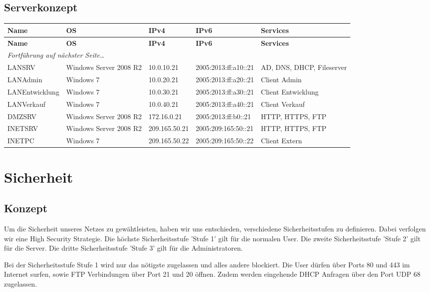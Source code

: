 \documentclass[11pt,a4paper,parskip=half]{scrartcl}
\begin{document}
\subsection{Serverkonzept}
\begin{longtable}{p{3cm}|p{2.5cm}|p{2.3cm}|p{3.5cm}|p{3cm}}
	\textbf{Name} & \textbf{OS} & \textbf{IPv4} & \textbf{IPv6} & \textbf{Services}\\
	\hline
	\endfirsthead
	\textbf{Name} & \textbf{OS} & \textbf{IPv4} & \textbf{IPv6} & \textbf{Services}\\
	\hline
	\endhead
	\hline
	\multicolumn{2}{l}{\textit{Fortführung auf nächster Seite\ldots}} \\
	\endfoot
	\endlastfoot
	LANSRV & Windows Server 2008 R2 & 10.0.10.21 & 2005:2013:ff:a10::21 & AD, DNS, DHCP, Fileserver\\
	LANAdmin & Windows 7 & 10.0.20.21 & 2005:2013:ff:a20::21 & Client Admin\\
	LANEntwicklung & Windows 7 & 10.0.30.21 & 2005:2013:ff:a30::21 & Client Entwicklung\\
	LANVerkauf & Windows 7 & 10.0.40.21 & 2005:2013:ff:a40::21 & Client Verkauf\\
	DMZSRV & Windows Server 2008 R2	& 172.16.0.21 & 2005:2013:ff:b0::21	& HTTP, HTTPS, FTP\\
	INETSRV	& Windows Server 2008 R2 & 209.165.50.21 & 2005:209:165:50::21 & HTTP, HTTPS, FTP\\
	INETPC & Windows 7 & 209.165.50.22 & 2005:209:165:50::22 & Client Extern\\
\end{longtable}


\newpage
\section{Sicherheit}
\subsection{Konzept}
Um die Sicherheit unseres Netzes zu gewähtleisten, haben wir uns entschieden, verschiedene Sicherheitsstufen zu definieren. Dabei verfolgen wir eine High Security Strategie. Die höchste Sicherheitsstufe 'Stufe 1' gilt für die normalen User. Die zweite Sicherheitsstufe 'Stufe 2' gilt für die Server. Die dritte Sicherheitsstufe 'Stufe 3' gilt für die Administratoren.

Bei der Sicherheitsstufe Stufe 1 wird nur das nötigste zugelassen und alles andere blockiert. Die User dürfen über Ports 80 und 443 im Internet surfen, sowie FTP Verbindungen über Port 21 und 20 öffnen. Zudem werden eingehende DHCP Anfragen über den Port UDP 68 zugelassen.
\end{document}
